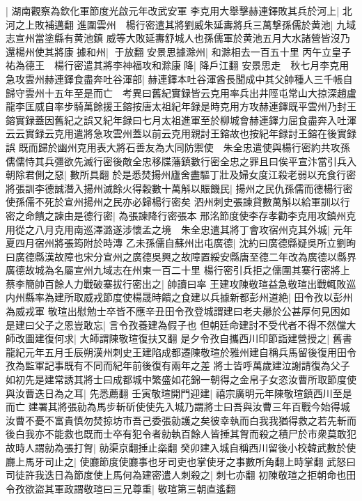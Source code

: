 |{
	湖南觀察為欽化軍節度光啟元年改武安軍}
李克用大舉擊赫連鐸敗其兵於河上|{
	北河之上敗補邁翻}
進圍雲州　楊行密遣其將劉威朱延夀將兵三萬撃孫儒於黄池|{
	九域志宣州當塗縣有黄池鎮}
威等大敗延夀舒城人也孫儒軍於黄池五月大水諸營皆沒乃還楊州使其將康據和州|{
	于放翻}
安景思據滁州|{
	和滁相去一百五十里}
丙午立皇子祐為德王　楊行密遣其將李神福攻和滁康降|{
	降戶江翻}
安景思走　秋七月李克用急攻雲州赫連鐸食盡奔吐谷渾部|{
	赫連鐸本吐谷渾酋長聞成中其父帥種人三千帳自歸守雲州十五年至是而亡　考異曰舊紀實録皆云克用率兵出井陘屯常山大掠深趙盧龍李匡威自率步騎萬餘援王鎔按唐太祖紀年録是時克用方攻赫連鐸既平雲州乃封王鎔實録蓋因舊紀之誤又紀年録曰七月太祖進軍至於柳城會赫連鐸力屈食盡奔入吐渾云云實録云克用遣將急攻雲州蓋以前云克用親討王鎔故也按紀年録討王鎔在後實録誤}
既而歸於幽州克用表大將石善友為大同防禦使　朱全忠遣使與楊行密約共攻孫儒儒恃其兵彊欲先滅行密後敵全忠移牒藩鎮數行密全忠之罪且曰俟平宣汴當引兵入朝除君側之惡|{
	數所具翻}
於是悉焚揚州廬舍盡驅丁壯及婦女度江殺老弱以充食行密將張訓李德誠潛入揚州滅餘火得穀數十萬斛以賑饑民|{
	揚州之民仇孫儒而德楊行密使孫儒不死於宣州揚州之民亦必歸楊行密矣}
泗州刺史張諫貸數萬斛以給軍訓以行密之命饋之諫由是德行密|{
	為張諫降行密張本}
邢洺節度使李存孝勸李克用攻鎮州克用從之八月克用南巡澤潞遂涉懷孟之境　朱全忠遣其將丁會攻宿州克其外城|{
	元年夏四月宿州將張筠附於時漙}
乙未孫儒自蘇州出屯廣德|{
	沈約曰廣德縣疑吳所立劉昫曰廣德縣漢故障也宋分宣州之廣德吳興之故障置綏安縣唐至德二年改為廣德以縣界廣德故城為名屬宣州九域志在州東一百二十里}
楊行密引兵拒之儒圍其寨行密將上蔡李簡帥百餘人力戰破寨拔行密出之|{
	帥讀曰率}
王建攻陳敬瑄益急敬瑄出戰輒敗巡内州縣率為建所取威戎節度使楊晟時饋之食建以兵據新都彭州道絶|{
	田令孜以彭州為威戎軍}
敬瑄出慰勉士卒皆不應辛丑田令孜登城謂建曰老夫曏於公甚厚何見困如是建曰父子之恩豈敢忘|{
	言令孜養建為假子也}
但朝廷命建討不受代者不得不然儻大師改圖建復何求|{
	大師謂陳敬瑄復扶又翻}
是夕令孜自攜西川印節詣建營授之|{
	舊書龍紀元年五月壬辰朔漢州刺史王建陷成都遷陳敬瑄於雅州建自稱兵馬留後復用田令孜為監軍記事既有不同而紀年前後復有兩年之差}
將士皆呼萬歲建泣謝請復為父子如初先是建常誘其將士曰成都城中繁盛如花錦一朝得之金帛子女恣汝曹所取節度使與汝曹迭日為之耳|{
	先悉薦翻}
壬寅敬瑄開門迎建|{
	禧宗廣明元年陳敬瑄鎮西川至是而亡}
建署其將張勍為馬步斬斫使使先入城乃謂將士曰吾與汝曹三年百戰今始得城汝曹不憂不富貴慎勿焚掠坊市吾己委張勍護之矣彼幸執而白我我猶得救之若先斬而後白我亦不能救也既而士卒有犯令者勍執百餘人皆捶其胷而殺之積尸於市衆莫敢犯故時人謂勍為張打胷|{
	勍渠京翻捶止橤翻}
癸卯建入城自稱西川留後小校韓武數於使廳上馬牙司止之|{
	使廳節度使廳事也牙司吏也掌使牙之事數所角翻上時掌翻}
武怒曰司徒許我迭日為節度使上馬何為建密遣人刺殺之|{
	刺七亦翻}
初陳敬瑄之拒朝命也田令孜欲盜其軍政謂敬瑄曰三兄尊重|{
	敬瑄第三朝直遙翻}
